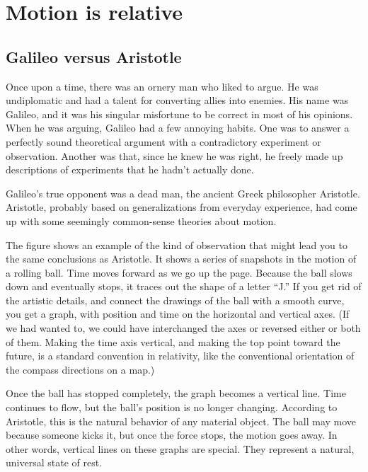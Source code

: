 \chapter{Motion is relative}

\section{Galileo versus Aristotle}

Once upon a time, there was an ornery man who liked to argue.
He was undiplomatic and had a talent for converting allies into enemies.
His name was Galileo, and it was his singular misfortune to be correct in most of his opinions.
When he was arguing, Galileo had a few annoying habits. One was to answer a perfectly sound theoretical
argument with a contradictory experiment or observation. Another was that, since he
knew he was right, he freely made up descriptions of experiments that he hadn't actually done.

Galileo's true opponent was a dead man, the ancient Greek philosopher Aristotle.
Aristotle, probably based on generalizations from everyday experience, had come up
with some seemingly common-sense theories about motion.

\pagebreak

The figure shows an example of the kind of observation that might lead you to
the same conclusions as Aristotle. It shows a series of snapshots in the motion
of a rolling ball. Time moves forward as we go up the page.
Because the ball slows down and eventually stops, it traces out the shape of a
letter ``J.'' If you get rid of the artistic details, and connect the drawings of
the ball with a smooth curve, you get a graph, with position and time on the
horizontal and vertical axes. (If we had wanted to, we could have interchanged
the axes or reversed either or both of them. Making the time axis vertical, and
making the top point toward the future, is a standard convention in relativity,
like the conventional orientation of the compass directions on a map.)

Once the ball has stopped completely, the graph becomes a vertical line. Time
continues to flow, but the ball's position is no longer changing. According to
Aristotle, this is the natural behavior of any material object. The ball may move
because someone kicks it, but once the force stops, the motion goes away.
In other words, vertical lines on these graphs are special. They represent a natural, universal
state of rest.

